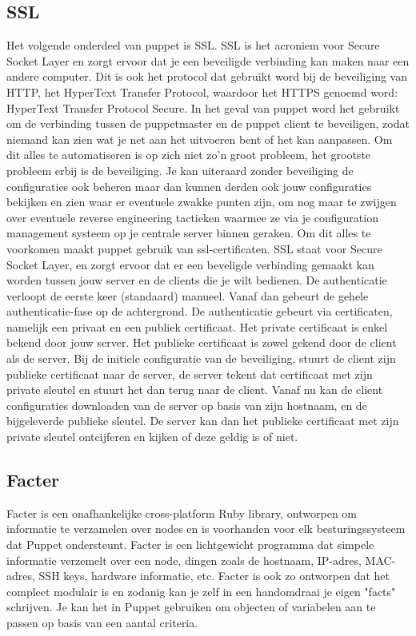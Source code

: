 \subsection{SSL}
Het volgende onderdeel van puppet is SSL. SSL is het acroniem voor Secure Socket Layer en zorgt ervoor dat je een beveiligde verbinding kan maken naar een andere computer. Dit is ook het protocol dat gebruikt word bij de beveiliging van HTTP, het HyperText Transfer Protocol, waardoor het HTTPS genoemd word: HyperText Transfer Protocol Secure. In het geval van puppet word het gebruikt om de verbinding tussen de puppetmaster en de puppet client te beveiligen, zodat niemand kan zien wat je net aan het uitvoeren bent of het kan aanpassen.
%
Om dit alles te automatiseren is op zich niet zo'n groot probleem, het grootste probleem erbij is de beveiliging. Je kan uiteraard zonder beveiliging de configuraties ook beheren maar dan kunnen derden ook jouw configuraties bekijken en zien waar er eventuele zwakke punten zijn, om nog maar te zwijgen over eventuele reverse engineering tactieken waarmee ze via je configuration management systeem op je centrale server binnen geraken. Om dit alles te voorkomen maakt puppet gebruik van ssl-certificaten. SSL staat voor Secure Socket Layer, en zorgt ervoor dat er een beveligde verbinding gemaakt kan worden tussen jouw server en de clients die je wilt bedienen. De authenticatie verloopt de eerste keer (standaard) manueel. Vanaf dan gebeurt de gehele authenticatie-fase op de achtergrond. De authenticatie gebeurt via certificaten, namelijk een privaat en een publiek certificaat. Het private certificaat is enkel bekend door jouw server. Het publieke certificaat is zowel gekend door de client als de server. Bij de initiele configuratie van de beveiliging, stuurt de client zijn publieke certificaat naar de server, de server tekent dat certificaat met zijn private sleutel en stuurt het dan terug naar de client. Vanaf nu kan de client configuraties downloaden van de server op basis van zijn hostnaam, en de bijgeleverde publieke sleutel. De server kan dan het publieke certificaat met zijn private sleutel ontcijferen en kijken of deze geldig is of niet.

\subsection{Facter}
Facter is een onafhankelijke cross-platform Ruby library, ontworpen om informatie te verzamelen over nodes en is voorhanden voor elk besturingssysteem dat Puppet ondersteunt. Facter is een lichtgewicht programma dat simpele informatie verzemelt over een node, dingen zoals de hostnaam, IP-adres, MAC-adres, SSH keys, hardware informatie, etc. Facter is ook zo ontworpen dat het compleet modulair is en zodanig kan je zelf in een handomdraai je eigen "facts" schrijven. Je kan het in Puppet gebruiken om objecten of variabelen aan te passen op basis van een aantal criteria.
